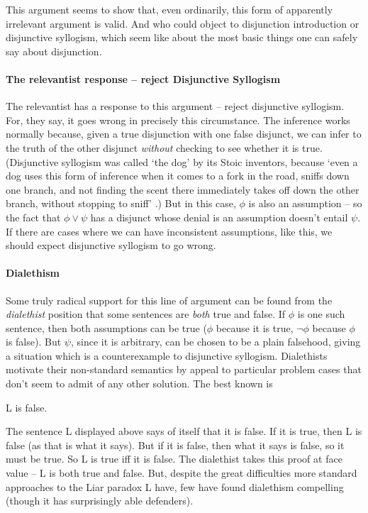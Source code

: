 This argument seems to show that, even ordinarily, this form of apparently irrelevant argument is valid. And who could object to disjunction introduction or disjunctive syllogism, which seem like about the most basic things one can safely say about disjunction.

\paragraph{The relevantist response – reject Disjunctive Syllogism} The relevantist has a response to this argument – reject disjunctive syllogism. For, they say, it goes wrong in precisely this circumstance. The inference works normally because, given a true disjunction with one false disjunct, we can infer to the truth of the other disjunct \emph{without} checking to see whether it is true. (Disjunctive syllogism was called `the dog' by its Stoic inventors, because `even a dog uses this form of inference when it comes to a fork in the road, sniffs down one branch, and not finding the scent there immediately takes off down the other branch, without stopping to sniff' \citep[99--100]{burphilo}.) But in this case, $\phi$  is also an assumption – so the fact that $\phi \vee \psi$ has a disjunct whose denial is an assumption doesn't entail $\psi$. If there are cases where we can have inconsistent assumptions, like this, we should expect disjunctive syllogism to go wrong.

\paragraph{Dialethism} Some truly radical support for this line of argument can be found from the \emph{dialethist} position that some sentences are \emph{both} true and false. If $\phi$ is one such sentence, then both assumptions can be true ($\phi$ because it is true, $\neg\phi$ because $\phi$ is false). But $\psi$, since it is arbitrary, can be chosen to be a plain falsehood, giving a situation  which is a counterexample to disjunctive syllogism. Dialethists motivate their non-standard semantics by appeal to particular problem cases that don't seem to admit of any other solution. The best known is \begin{exe}
	 L is false.
\end{exe} The sentence L displayed above says of itself that it is false. If it is true, then L is false (as that is what it says). But if it is false, then what it says is false, so it must be true. So L is true iff it is false. The dialethist takes this proof at face value – L is both true and false. But, despite the great difficulties more standard approaches to the Liar paradox L have, few have found dialethism compelling (though it has surprisingly able defenders). 


